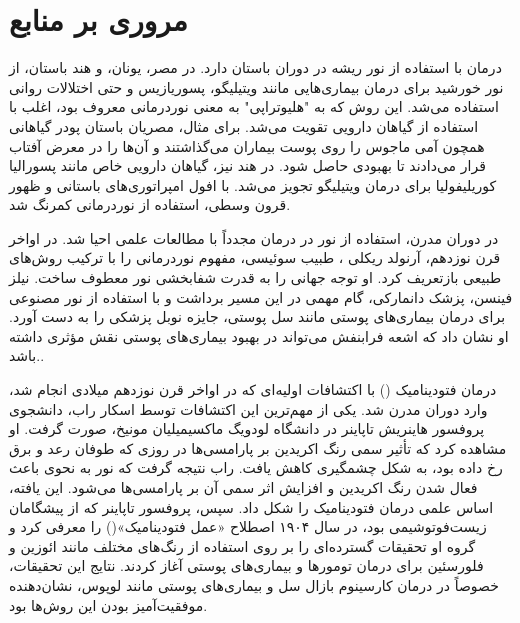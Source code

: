 \chapter{مروری بر منابع}


درمان با استفاده از نور ریشه در دوران باستان دارد. در مصر، یونان، و هند باستان، از نور خورشید برای درمان بیماری‌هایی مانند ویتیلیگو، پسوریازیس و حتی اختلالات روانی استفاده می‌شد. این روش که به "هلیوتراپی"
 به معنی نوردرمانی معروف بود، اغلب با استفاده از گیاهان دارویی تقویت می‌شد. برای مثال، مصریان باستان پودر گیاهانی همچون آمی ماجوس
 را روی پوست بیماران می‌گذاشتند و آن‌ها را در معرض آفتاب قرار می‌دادند تا بهبودی حاصل شود. در هند نیز، گیاهان دارویی خاص مانند پسورالیا کوریلیفولیا
 برای درمان ویتیلیگو
تجویز می‌شد. با افول امپراتوری‌های باستانی و ظهور قرون وسطی، استفاده از نوردرمانی کمرنگ شد\cite{pdt-Lu2009581,pdt-theory-to-application}.

در دوران مدرن، استفاده از نور در درمان مجدداً با مطالعات علمی احیا شد. در اواخر قرن نوزدهم، آرنولد ریکلی
، طبیب سوئیسی، مفهوم نوردرمانی را با ترکیب روش‌های طبیعی بازتعریف کرد. او توجه جهانی را به قدرت شفابخشی نور معطوف ساخت. نیلز فینسن، پزشک دانمارکی، گام مهمی در این مسیر برداشت و با استفاده از نور مصنوعی برای درمان بیماری‌های پوستی مانند سل پوستی، جایزه نوبل پزشکی را به دست آورد. او نشان داد که اشعه فرابنفش می‌تواند در بهبود بیماری‌های پوستی نقش مؤثری داشته باشد.\cite{pdt-theory-to-application}.

درمان فتودینامیک
()
با اکتشافات اولیه‌ای که در اواخر قرن نوزدهم میلادی انجام شد، وارد دوران مدرن شد. یکی از مهم‌ترین این اکتشافات توسط اسکار راب، دانشجوی پروفسور هاینریش تاپاینر در دانشگاه لودویگ ماکسیمیلیان مونیخ، صورت گرفت. او مشاهده کرد که تأثیر سمی رنگ اکریدین بر پارامسی‌ها در روزی که طوفان رعد و برق رخ داده بود، به شکل چشمگیری کاهش یافت. راب نتیجه گرفت که نور به نحوی باعث فعال شدن رنگ اکریدین و افزایش اثر سمی آن بر پارامسی‌ها می‌شود. این یافته، اساس علمی درمان فتودینامیک را شکل داد. سپس، پروفسور تاپاینر که از پیشگامان زیست‌فوتوشیمی بود، در سال ۱۹۰۴ اصطلاح «عمل فتودینامیک»() را معرفی کرد و گروه او تحقیقات گسترده‌ای را بر روی استفاده از رنگ‌های مختلف مانند ائوزین و فلورسئین برای درمان تومورها و بیماری‌های پوستی آغاز کردند. نتایج این تحقیقات، خصوصاً در درمان کارسینوم بازال سل و بیماری‌های پوستی مانند لوپوس، نشان‌دهنده موفقیت‌آمیز بودن این روش‌ها بود\cite{pdt-theory-to-application,pdt-Lu2009581}.

